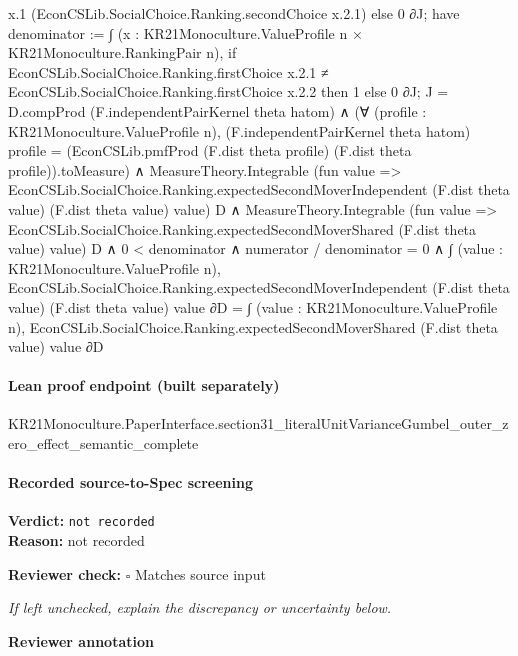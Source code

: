\documentclass[10pt]{article}
\newcommand{\reviewerbox}{%
  \par\noindent\fbox{\parbox{0.96\linewidth}{\rule{0pt}{0.38in}}}\par
}
\newcommand{\reviewmatch}[1]{%
  \par\noindent\textbf{Reviewer check:} $\square$\; #1\par
  \noindent\emph{If left unchecked, explain the discrepancy or uncertainty below.}\par
}
\begin{document}
\begin{ReviewVerbatim}
                        x.1 (EconCSLib.SocialChoice.Ranking.secondChoice x.2.1)
                    else 0 ∂J;
                have denominator :=
                  ∫ (x : KR21Monoculture.ValueProfile n × KR21Monoculture.RankingPair n),
                    if
                        EconCSLib.SocialChoice.Ranking.firstChoice x.2.1 ≠
                          EconCSLib.SocialChoice.Ranking.firstChoice x.2.2 then
                      1
                    else 0 ∂J;
                J = D.compProd (F.independentPairKernel theta hatom) ∧
                  (∀ (profile : KR21Monoculture.ValueProfile n),
                      (F.independentPairKernel theta hatom) profile =
                        (EconCSLib.pmfProd (F.dist theta profile) (F.dist theta profile)).toMeasure) ∧
                    MeasureTheory.Integrable
                        (fun value =>
                          EconCSLib.SocialChoice.Ranking.expectedSecondMoverIndependent (F.dist theta value)
                            (F.dist theta value) value)
                        D ∧
                      MeasureTheory.Integrable
                          (fun value =>
                            EconCSLib.SocialChoice.Ranking.expectedSecondMoverShared (F.dist theta value) value)
                          D ∧
                        0 < denominator ∧
                          numerator / denominator = 0 ∧
                            ∫ (value : KR21Monoculture.ValueProfile n),
                                EconCSLib.SocialChoice.Ranking.expectedSecondMoverIndependent (F.dist theta value)
                                  (F.dist theta value) value ∂D =
                              ∫ (value : KR21Monoculture.ValueProfile n),
                                EconCSLib.SocialChoice.Ranking.expectedSecondMoverShared (F.dist theta value) value ∂D
\end{ReviewVerbatim}

\paragraph{Lean proof endpoint (built separately)}\begin{ReviewVerbatim}
KR21Monoculture.PaperInterface.section31_literalUnitVarianceGumbel_outer_zero_effect_semantic_complete
\end{ReviewVerbatim}

\paragraph{Recorded source-to-Spec screening}
\textbf{Verdict:} \texttt{not recorded}
\\
\textbf{Reason:} not recorded
\reviewmatch{Matches source input}
\noindent\textbf{Reviewer annotation}\par
\reviewerbox
\clearpage
\hypertarget{source-claim-8dd2c310e7ffc8a6}{}
\end{document}
